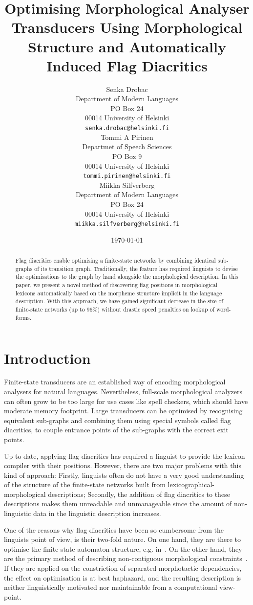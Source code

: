 \documentclass[11pt]{article}
\title{Optimising Morphological Analyser Transducers Using Morphological Structure
and Automatically Induced Flag Diacritics}
\author{Senka Drobac \\
Department of Modern Languages \\
PO Box 24 \\
00014 University of Helsinki \\
  {\tt senka.drobac@helsinki.fi} \\\And
  Tommi A Pirinen \\
Departmet of Speech Sciences\\
PO Box 9\\
00014 University of Helsinki\\
  {\tt tommi.pirinen@helsinki.fi} \\\And
  Miikka Silfverberg \\
  Department of Modern Languages \\
    PO Box 24 \\
    00014 University of Helsinki \\
    {\tt miikka.silfverberg@helsinki.fi} \\}
\date{\today}
\begin{document}
\maketitle
\begin{abstract}

    Flag diacritics enable optimising a finite-state networks by
    combining identical sub-graphs of its transition
    graph. Traditionally, the feature has required linguists to devise
    the optimisations to the graph by hand alongside the morphological
    description. In this paper, we present a novel method of
    discovering flag positions in morphological lexicons automatically
    based on the morpheme structure implicit in the language
    description. With this approach, we have gained significant
    decrease in the size of finite-state networks (up to 96\%) without drastic
    speed penalties on lookup of word-forms.

\end{abstract}

\section{Introduction}

Finite-state transducers are an established way of encoding
morphological analysers for natural languages. Nevertheless,
full-scale morphological analyzers can often grow to be too large for
use cases like spell checkers, which should have moderate memory
footprint. Large transducers can be optimised by recognising
equivalent sub-graphs and combining them using special symbols called
flag diacritics, to couple entrance points of the sub-graphs with the
correct exit points.

Up to date, applying flag diacritics has required a linguist to provide
the lexicon compiler with their positions. However, there are two
major problems with this kind of approach: Firstly, linguists often do
not have a very good understanding of the structure of the
finite-state networks built from lexicographical-morphological
descriptions; Secondly, the addition of flag diacritics to these
descriptions makes them unreadable and unmanageable since the amount
of non-linguistic data in the linguistic description increases. 

One of the reasons why flag diacritics have been so cumbersome from
the linguists point of view, is their two-fold nature. On one hand,
they are there to optimise the finite-state automaton structure,
e.g. in~\cite{karttunen2006numbers}. On the other hand, they are the
primary method of describing non-contiguous morphological
constraints~\cite{beesley1998constraining}. If they are applied on the
constriction of separated morphotactic dependencies, the effect on
optimisation is at best haphazard, and the resulting description is
neither linguistically motivated nor maintainable from a computational
view-point.
\end{document}
